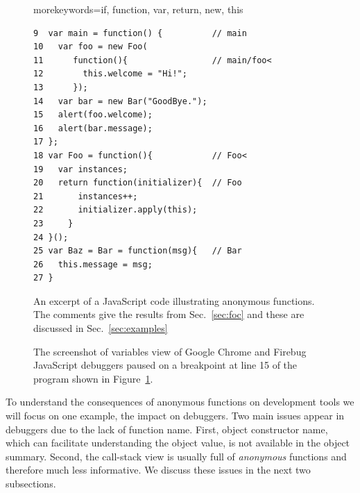 \documentclass[10pt, preprint]{sigplanconf}
\begin{document}
\begin{figure}[htp]

\lstset{basicstyle=\scriptsize}
{morekeywords={if, function, var, return, new, this}}

\begin{lstlisting}[frame=single, language=myLang]
9  var main = function() {          // main
10   var foo = new Foo(            
11      function(){                 // main/foo<
12        this.welcome = "Hi!";
13      });
14   var bar = new Bar("GoodBye.");
15   alert(foo.welcome);
16   alert(bar.message);
17 };
18 var Foo = function(){            // Foo<    
19   var instances;
20   return function(initializer){  // Foo
21       instances++;         
22       initializer.apply(this);
23     }
24 }();
25 var Baz = Bar = function(msg){   // Bar
26   this.message = msg;
27 }
\end{lstlisting}
\caption{An excerpt of a JavaScript code illustrating anonymous functions. The comments give the results from Sec.~\ref{sec:foc} and these are discussed in Sec.~\ref{sec:examples}}
\label{js-code}
\end{figure}


\begin{figure}[htp]
\centerline{
\hfil
{}}
\caption{The screenshot of variables view of Google Chrome and Firebug JavaScript debuggers paused on a breakpoint at line 15 of the program shown in Figure~\ref{js-code}.}
\label{debuggers-objects}
\end{figure}

To understand the consequences of anonymous functions on development tools we will focus on one example, the impact on debuggers.
Two main issues appear in debuggers due to the lack of function name. First, object constructor name, which can facilitate understanding the object value, is not available in the object summary. Second, the call-stack view is usually full of \textit{anonymous} functions and therefore much less informative. We discuss these issues in the next two subsections. 
 
\end{document}
